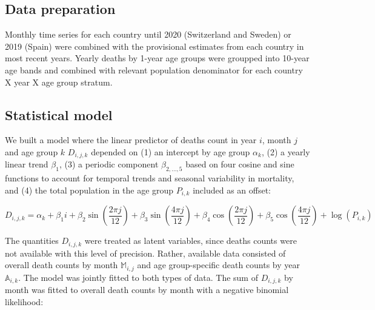 \documentclass{article}
\begin{document}
	\subsection{Data preparation}
	
	Monthly time series for each country until 2020 (Switzerland and Sweden) or 2019 (Spain) were combined with the provisional estimates from each country in most recent years. Yearly deaths by 1-year age groups were groupped into 10-year age bands and combined with relevant population denominator for each country X year X age group stratum.  
	
	\subsection{Statistical model}
	
	We built a model where the linear predictor of deaths count in year $i$, month $j$ and age group $k$ $D_{i,j,k}$ depended on (1) an intercept by age group $\alpha_k$, (2) a yearly linear trend $\beta_1$, (3) a periodic component $\beta_{2,\ldots,5}$ based on four cosine and sine functions to account for temporal trends and seasonal variability in mortality, and (4) the total population in the age group $P_{i,k}$ included as an offset: 
	
	\begin{equation}
		D_{i,j,k} = \alpha_k + 
		\beta_1 i + 
		\beta_2 \sin\left(\frac{2\pi j}{12}\right) + 
		\beta_3 \sin\left(\frac{4\pi j}{12}\right) + 
		\beta_4 \cos\left(\frac{2\pi j}{12}\right) + 
		\beta_5 \cos\left(\frac{4\pi j}{12}\right) + 
		\log(P_{i,k})
	\end{equation}
	
	
	The quantities $D_{i,j,k}$ were treated as latent variables, since deaths counts were not available with this level of precision. Rather, available data consisted of overall death counts by month $\mathds{M}_{i,j}$ and age group-specific death counts by year $\mathds{A}_{i,k}$. The model was jointly fitted to both types of data.  The sum of $D_{i,j,k}$ by month was fitted to overall death counts by month with a negative binomial likelihood:
	
\end{document}
